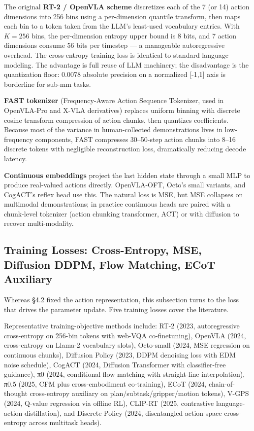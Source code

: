 The original \textbf{RT-2 / OpenVLA scheme} discretizes each of the 7 (or 14) action dimensions into 256 bins using a per-dimension quantile transform, then maps each bin to a token taken from the LLM's least-used vocabulary entries. With \(K = 256\) bins, the per-dimension entropy upper bound is 8 bits, and 7 action dimensions consume 56 bits per timestep --- a manageable autoregressive overhead. The cross-entropy training loss is identical to standard language modeling. The advantage is full reuse of LLM machinery; the disadvantage is the quantization floor: 0.0078 absolute precision on a normalized {[}-1,1{]} axis is borderline for sub-mm tasks.

\textbf{FAST tokenizer} (Frequency-Aware Action Sequence Tokenizer, used in OpenVLA-Pro and X-VLA derivatives) replaces uniform binning with discrete cosine transform compression of action chunks, then quantizes coefficients. Because most of the variance in human-collected demonstrations lives in low-frequency components, FAST compresses 30--50-step action chunks into 8--16 discrete tokens with negligible reconstruction loss, dramatically reducing decode latency.

\textbf{Continuous embeddings} project the last hidden state through a small MLP to produce real-valued actions directly. OpenVLA-OFT, Octo's small variants, and CogACT's reflex head use this. The natural loss is MSE, but MSE collapses on multimodal demonstrations; in practice continuous heads are paired with a chunk-level tokenizer (action chunking transformer, ACT) or with diffusion to recover multi-modality.

\subsection{Training Losses: Cross-Entropy, MSE, Diffusion DDPM, Flow Matching, ECoT Auxiliary}\label{training-losses-cross-entropy-mse-diffusion-ddpm-flow-matching-ecot-auxiliary}

Whereas §4.2 fixed the action representation, this subsection turns to the loss that drives the parameter update. Five training losses cover the literature.

Representative training-objective methods include: RT-2 (2023, autoregressive cross-entropy on 256-bin tokens with web-VQA co-finetuning), OpenVLA (2024, cross-entropy on Llama-2 vocabulary slots), Octo-small (2024, MSE regression on continuous chunks), Diffusion Policy (2023, DDPM denoising loss with EDM noise schedule), CogACT (2024, Diffusion Transformer with classifier-free guidance), π0 (2024, conditional flow matching with straight-line interpolation), π0.5 (2025, CFM plus cross-embodiment co-training), ECoT (2024, chain-of-thought cross-entropy auxiliary on plan/subtask/gripper/motion tokens), V-GPS (2024, Q-value regression via offline RL), CLIP-RT (2025, contrastive language-action distillation), and Discrete Policy (2024, disentangled action-space cross-entropy across multitask heads).

